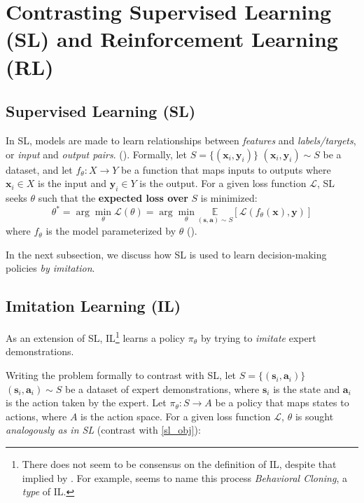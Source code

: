 \documentclass{article} %
\begin{document}
\section{Contrasting Supervised Learning (SL) and Reinforcement Learning (RL)}
\subsection{Supervised Learning (SL)}

In SL, models are made to learn relationships between \textit{features} and \textit{labels/targets}, 
or \textit{input} and \textit{output pairs}. (\cite{Goodfellow-et-al-2016}). 
Formally, let \st{$S = \{(\mathbf{x}_i, \mathbf{y}_i)\}$} {\color{red} $(\mathbf{x}_i, \mathbf{y}_i) \sim S$} be a dataset, 
and let $f_\theta: X \to Y$ be a function that maps inputs to outputs
where $\mathbf{x}_i \in X$ is the input and $\mathbf{y}_i \in Y$ is the output.
For a given loss function $\mathcal{L}$, SL seeks $\theta$ 
such that the \textbf{expected loss over} $S$ is minimized:
\begin{equation} \label{sl_obj}
    \theta^* = \arg\min_\theta \mathcal{L}(\theta) = \arg\min_\theta \underset{(\mathbf{s}, \mathbf{a}) \sim S}{\mathbb{E}}[\mathcal{L}(f_\theta(\mathbf{x}), \mathbf{y})]
\end{equation}
where $f_\theta$ is the model parameterized by $\theta$ (\cite{Levine-et-al-2023}).

In the next subsection, we discuss how SL is used to learn decision-making policies \textit{by imitation}.

\subsection{Imitation Learning (IL)}

As an extension of SL, IL\footnote{There does not seem to be consensus on the definition of IL, despite that implied by \cite{Levine-et-al-2023}. For example, \cite{Underactuated-2023} seems to name this process \textit{Behavioral Cloning}, a \textit{type} of IL.} 
learns a policy $\pi_\theta$ by trying to \textit{imitate} expert demonstrations.

Writing the problem formally to contrast with SL,
let \st{$S = \{(\mathbf{s}_i, \mathbf{a}_i)\}$} {\color{red} $(\mathbf{s}_i, \mathbf{a}_i) \sim S$} be a dataset of expert demonstrations, 
where $\mathbf{s}_i$ is the state and $\mathbf{a}_i$ is the action taken by the expert.
Let $\pi_\theta: S \to A$ be a policy that maps states to actions, where $A$ is the action space. 
For a given loss function $\mathcal{L}$, $\theta$ is sought \textit{analogously as in SL}
(contrast with \ref{sl_obj}):
\end{document}
